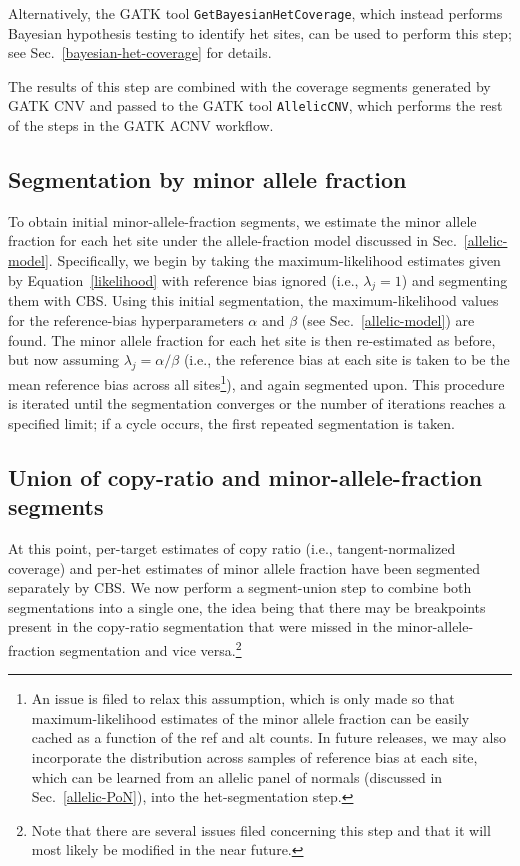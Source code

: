\documentclass[nofootinbib,amssymb,amsmath]{revtex4}
\begin{document}
Alternatively, the GATK tool \texttt{GetBayesianHetCoverage}, which instead performs Bayesian hypothesis testing to identify het sites, can be used to perform this step; see Sec.~\ref{bayesian-het-coverage} for details.

The results of this step are combined with the coverage segments generated by GATK CNV and passed to the GATK tool \texttt{AllelicCNV}, which performs the rest of the steps in the GATK ACNV workflow.

\subsection{Segmentation by minor allele fraction}

To obtain initial minor-allele-fraction segments, we estimate the minor allele fraction for each het site under the allele-fraction model discussed in Sec.~\ref{allelic-model}.  Specifically, we begin by taking the maximum-likelihood estimates given by Equation~\ref{likelihood} with reference bias ignored (i.e., $\lambda_j = 1$) and segmenting them with CBS.  Using this initial segmentation, the maximum-likelihood values for the reference-bias hyperparameters $\alpha$ and $\beta$ (see Sec.~\ref{allelic-model})  are found.  The minor allele fraction for each het site is then re-estimated as before, but now assuming $\lambda_j = \alpha / \beta$ (i.e., the reference bias at each site is taken to be the mean reference bias across all sites\footnote{An issue is filed to relax this assumption, which is only made so that maximum-likelihood estimates of the minor allele fraction can be easily cached as a function of the ref and alt counts.  In future releases, we may also incorporate the distribution across samples of reference bias at each site, which can be learned from an allelic panel of normals (discussed in Sec.~\ref{allelic-PoN}), into the het-segmentation step.}), and again segmented upon.  This procedure is iterated until the segmentation converges or the number of iterations reaches a specified limit; if a cycle occurs, the first repeated segmentation is taken.

\subsection{Union of copy-ratio and minor-allele-fraction segments} \label{segment-union}

At this point, per-target estimates of copy ratio (i.e., tangent-normalized coverage) and per-het estimates of minor allele fraction have been segmented separately by CBS.  We now perform a segment-union step to combine both segmentations into a single one, the idea being that there may be breakpoints present in the copy-ratio segmentation that were missed in the minor-allele-fraction segmentation and vice versa.\footnote{Note that there are several issues filed concerning this step and that it will most likely be modified in the near future.}
\end{document}
